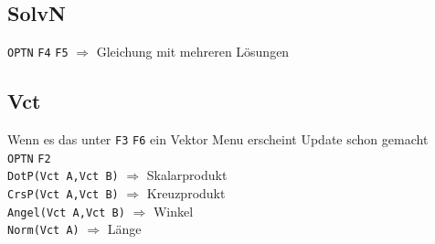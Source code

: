 \documentclass[12pt,a4paper]{article}
\def\g#1{\texttt{#1}}
\begin{document}
	 \subsection{SolvN}
	 \g{OPTN} \g{F4} \g{F5} $\Rightarrow$ Gleichung mit mehreren Lösungen
	 
	 \subsection{Vct}
	 Wenn es das unter \g{F3} \g{F6} ein Vektor Menu erscheint Update schon gemacht\\
	 \g{OPTN} \g{F2}\\
	 \g{DotP(Vct A,Vct B)} $\Rightarrow$ Skalarprodukt\\
	 \g{CrsP(Vct A,Vct B)} $\Rightarrow$ Kreuzprodukt\\
	 \g{Angel(Vct A,Vct B)} $\Rightarrow$ Winkel\\
	 \g{Norm(Vct A)} $\Rightarrow$ L\"ange
	 
\end{document}
